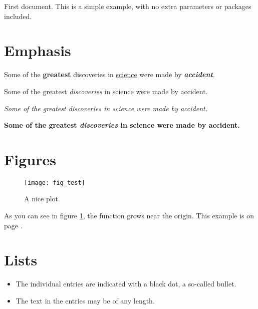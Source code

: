 \documentclass[12pt, a4paper]{article} %
\begin{document}
        First document. This is a simple example, with no
        extra parameters or packages included.

    \section{Emphasis}
        Some of the \textbf{greatest}                          %
        discoveries in \underline{science}                     %
        were made by \textbf{\textit{accident}}.               %

        Some of the greatest \emph{discoveries} in science
        were made by accident.

        \textit{Some of the greatest \emph{discoveries}        %
        in science were made by accident.}

        \textbf{Some of the greatest \emph{discoveries}
        in science were made by accident.}

    \section{Figures}
        \begin{figure}[h]
            \centering
            \texttt{[image: fig\_test]}   %
            \caption
            {
                A nice plot.
            }
            \label{fig:test}
        \end{figure}

        As you can see in figure \ref{fig:test},
        the function grows near the origin.
        This example is on page \pageref{fig:test}.

    \section{Lists}
        \begin{itemize}                                        %
            \item The individual entries are indicated with
                  a black dot, a so-called bullet.
            \item The text in the entries may be of any length.
        \end{itemize}
\end{document}
